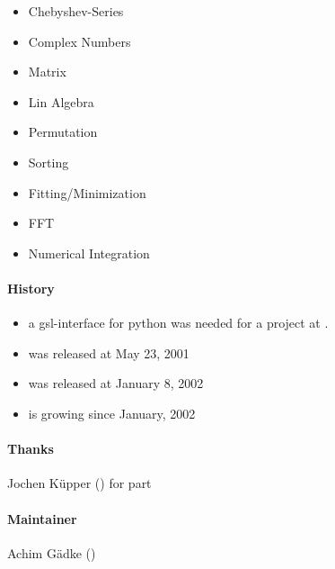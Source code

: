 \begin{itemize}
\item Chebyshev-Series
\item Complex Numbers
\item Matrix
\item Lin Algebra
\item Permutation
\item Sorting
\item Fitting/Minimization
\item FFT
\item Numerical Integration
\end{itemize}

\paragraph*{History}
\begin{itemize}
\item a gsl-interface for python was needed for a project at
.
\item {} was released at May 23, 2001
\item {} was released at January 8, 2002
\item {} is growing since January, 2002
\end{itemize}

\paragraph*{Thanks}
Jochen K\"upper () for  part

\paragraph*{Maintainer}
Achim G\"adke ()
